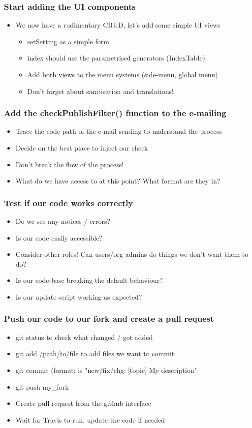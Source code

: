 \begin{frame}
  \frametitle{Start adding the UI components}
  \begin{itemize}
    \item We now have a rudimentary CRUD, let's add some simple UI views
    \begin{itemize}
      \item setSetting as a simple form
      \item index should use the parametrised generators (IndexTable)
      \item Add both views to the menu systems (side-menu, global menu)
      \item Don't forget about sanitisation and translations!
    \end{itemize}
  \end{itemize}
\end{frame}

\begin{frame}
  \frametitle{Add the checkPublishFilter() function to the e-mailing}
  \begin{itemize}
    \item Trace the code path of the e-mail sending to understand the process
    \item Decide on the best place to inject our check
    \item Don't break the flow of the process!
    \item What do we have access to at this point? What format are they in?
  \end{itemize}
\end{frame}

\begin{frame}
  \frametitle{Test if our code works correctly}
  \begin{itemize}
    \item Do we see any notices / errors?
    \item Is our code easily accessible?
    \item Consider other roles! Can users/org admins do things we don't want them to do?
    \item Is our code-base breaking the default behaviour?
    \item Is our update script working as expected?
  \end{itemize}
\end{frame}

\begin{frame}
  \frametitle{Push our code to our fork and create a pull request}
  \begin{itemize}
     \item git status to check what changed / got added
     \item git add /path/to/file to add files we want to commit
     \item git commit (format: is "new/fix/chg: [topic] My description"
     \item git push my\_fork
     \item Create pull request from the github interface
     \item Wait for Travis to run, update the code if needed
  \end{itemize}
\end{frame}
